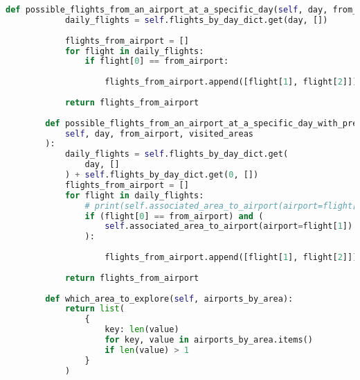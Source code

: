 \begin{lstlisting}[language = Python]
        def possible_flights_from_an_airport_at_a_specific_day(self, day, from_airport):
            daily_flights = self.flights_by_day_dict.get(day, [])
    
            flights_from_airport = []
            for flight in daily_flights:
                if flight[0] == from_airport:
    
                    flights_from_airport.append([flight[1], flight[2]])
    
            return flights_from_airport
    
        def possible_flights_from_an_airport_at_a_specific_day_with_previous_areas(
            self, day, from_airport, visited_areas
        ):
            daily_flights = self.flights_by_day_dict.get(
                day, []
            ) + self.flights_by_day_dict.get(0, [])
            flights_from_airport = []
            for flight in daily_flights:
                # print(self.associated_area_to_airport(airport=flight[0]))
                if (flight[0] == from_airport) and (
                    self.associated_area_to_airport(airport=flight[1]) not in visited_areas
                ):
    
                    flights_from_airport.append([flight[1], flight[2]])
    
            return flights_from_airport
    
        def which_area_to_explore(self, airports_by_area):
            return list(
                {
                    key: len(value)
                    for key, value in airports_by_area.items()
                    if len(value) > 1
                }
            )
    

\end{lstlisting}
\newpage
